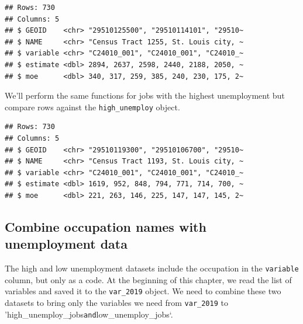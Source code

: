 \documentclass[
  krantz2]{krantz}
\makeatletter
\newenvironment{Shaded}{\begin{snugshade}}{\end{snugshade}}
\newcommand{\FunctionTok}[1]{\textcolor[rgb]{0,0,0}{#1}}
\newcommand{\NormalTok}[1]{#1}
\newcommand{\OtherTok}[1]{\textcolor[rgb]{0.37,0.37,0.37}{#1}}
\newcommand{\SpecialCharTok}[1]{\textcolor[rgb]{0,0,0}{#1}}
\newenvironment{kframe}{%
\medskip{}
\setlength{\fboxsep}{.8em}
 \def\at@end@of@kframe{}%
 \ifinner\ifhmode%
  \def\at@end@of@kframe{\end{minipage}}%
  \begin{minipage}{\columnwidth}%
 \fi\fi%
 \def\FrameCommand##1{\hskip\@totalleftmargin \hskip-\fboxsep
 \colorbox{shadecolor}{##1}\hskip-\fboxsep
     \hskip-\linewidth \hskip-\@totalleftmargin \hskip\columnwidth}%
 \MakeFramed {\advance\hsize-\width
   \@totalleftmargin\z@ \linewidth\hsize
   \@setminipage}}%
 {\par\unskip\endMakeFramed%
 \at@end@of@kframe}
\renewenvironment{Shaded}{\begin{kframe}}{\end{kframe}}
\makeatother
\begin{document}
\begin{verbatim}
## Rows: 730
## Columns: 5
## $ GEOID    <chr> "29510125500", "29510114101", "29510~
## $ NAME     <chr> "Census Tract 1255, St. Louis city, ~
## $ variable <chr> "C24010_001", "C24010_001", "C24010_~
## $ estimate <dbl> 2894, 2637, 2598, 2440, 2188, 2050, ~
## $ moe      <dbl> 340, 317, 259, 385, 240, 230, 175, 2~
\end{verbatim}

We'll perform the same functions for jobs with the highest unemployment but compare rows against the \texttt{high\_unemploy} object.

\begin{Shaded}
\end{Shaded}

\begin{verbatim}
## Rows: 730
## Columns: 5
## $ GEOID    <chr> "29510119300", "29510106700", "29510~
## $ NAME     <chr> "Census Tract 1193, St. Louis city, ~
## $ variable <chr> "C24010_001", "C24010_001", "C24010_~
## $ estimate <dbl> 1619, 952, 848, 794, 771, 714, 700, ~
## $ moe      <dbl> 221, 263, 146, 225, 147, 147, 145, 2~
\end{verbatim}

\hypertarget{combine-occupation-names-with-unemployment-data}{%
\subsection{Combine occupation names with unemployment data}\label{combine-occupation-names-with-unemployment-data}}

The high and low unemployment datasets include the occupation in the \texttt{variable} column, but only as a code. At the beginning of this chapter, we read the list of variables and saved it to the \texttt{var\_2019} object. We need to combine these two datasets to bring only the variables we need from \texttt{var\_2019} to 'high\_unemploy\_jobs\texttt{and}low\_unemploy\_jobs`.
\end{document}
